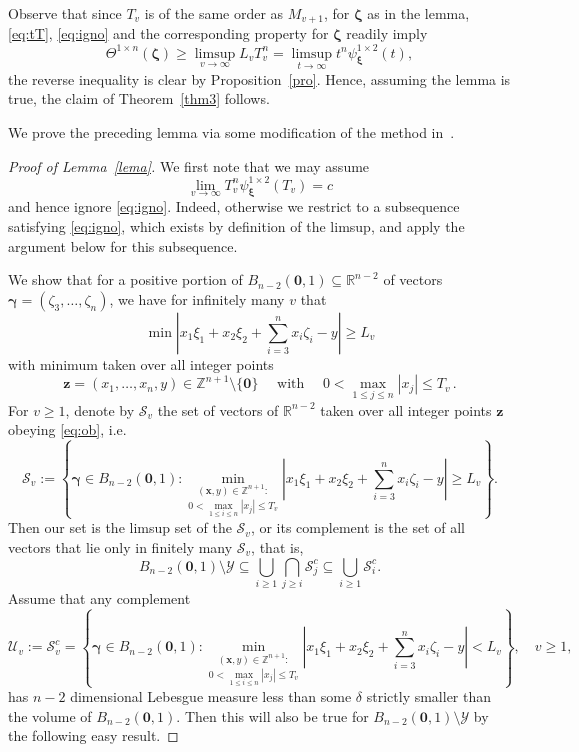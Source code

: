 \documentclass[10pt]{amsart}
\theoremstyle{definition}
\newcommand{\ux}{\boldsymbol{\xi}}
\newcommand{\uz}{\boldsymbol{\zeta}}
\newcommand{\R}{\mathbb{R}}
\newcommand{\Z}{\mathbb{Z}}
\newcommand{\ug}{\boldsymbol{\gamma}}
\begin{document}
Observe that since $T_v$ is of the same order as $M_{v+1}$, for $\uz$ as in the lemma,  \eqref{eq:tT}, \eqref{eq:igno} and the corresponding property for $\uz$ readily imply
\[
\Theta^{1\times n}(\uz)\ge\limsup_{v\to\infty} L_v T_{v}^{n}=\limsup_{t\to \infty} t^{n}\psi_{\ux}^{1\times 2}(t),
\]
the reverse inequality is clear by Proposition~\ref{pro}.
Hence, assuming the lemma is true, the claim of Theorem~\ref{thm3} follows.

We prove the preceding lemma via some modification of the method in~\cite{ngm}.

\begin{proof}[Proof of Lemma~\ref{lema}]
 We first note that we may assume
\[
\lim_{v\to\infty} T_v^{n}\psi_{\ux}^{1\times 2}(T_v)=c
\]
and hence ignore \eqref{eq:igno}. Indeed, otherwise we restrict to a subsequence
satisfying \eqref{eq:igno}, which exists by definition of the limsup, and apply the argument below for this subsequence.\par 
We show
that for a positive portion of $B_{n-2}(\boldsymbol{0},1)\subseteq \R^{n-2}$
of vectors $\boldsymbol{\gamma}=(\zeta_3,\ldots,\zeta_n)$,
we have for infinitely many $v$ that
\begin{equation} \label{eq:nega}
\min \left| x_{1}\xi_{1}+x_{2}\xi_{2}+ \sum_{i=3}^{n} x_i \zeta_i - y \right| \ge L_{v}
\end{equation}
with minimum taken over all integer points
\begin{equation} \label{eq:ob}
\boldsymbol{z}= (x_1,\ldots,x_{n},y)\in \Z^{n+1}\setminus \{\boldsymbol{0}\}
\quad \text{ with } \quad 
0<\max_{1\le j\le n} |x_j| \le T_v\, . 
\end{equation}
For $v\ge 1$, denote by $\mathcal{S}_v$ the set of vectors of $\R^{n-2}$
taken over all integer points $\boldsymbol{z}$ obeying \eqref{eq:ob}, i.e.
\begin{equation*}
    \mathcal{S}_{v}:=\left\{ \ug \in B_{n-2}(\boldsymbol{0},1): \underset{0<\max_{1\leq i \leq n}|x_{j}|\leq T_{v}}{\min_{(\boldsymbol{x},y)\in\Z^{n+1}:}}
     \left| x_{1}\xi_{1}+x_{2}\xi_{2}+\sum_{i=3}^{n}x_{i}\zeta_{i} -y\right|\geq L_{v} \right\}.
\end{equation*}
Then our set is the limsup set of the $\mathcal{S}_v$, or its complement
is the set of all vectors that lie only in finitely many $\mathcal{S}_v$, that is, 
\begin{equation} \label{eq:wia}
B_{n-2}(\boldsymbol{0},1)\setminus \mathcal{Y}\subseteq 
\bigcup_{i\ge 1} \bigcap_{j\ge i} \mathcal{S}_j^{c}\subseteq \bigcup_{i\ge 1} \mathcal{S}_i^{c}.
\end{equation}
Assume that any complement 
\[
\mathcal{U}_v:= \mathcal{S}_v^{c}= \left\{ \ug \in B_{n-2}(\boldsymbol{0},1): \underset{0<\max_{1\leq i \leq n}|x_{j}|\leq T_{v}}{\min_{(\boldsymbol{x},y)\in\Z^{n+1}:}}
     \left| x_{1}\xi_{1}+x_{2}\xi_{2}+\sum_{i=3}^{n}x_{i}\zeta_{i} -y\right|< L_{v} \right\} , \quad v\ge 1,
\]
has $n-2$ dimensional Lebesgue measure less than some $\delta$ strictly smaller than the volume of $B_{n-2}(\boldsymbol{0},1)$. 
Then this will also be 
true for $B_{n-2}(\boldsymbol{0},1)\setminus \mathcal{Y}$ by the following easy result.


\end{proof}
\end{document}
